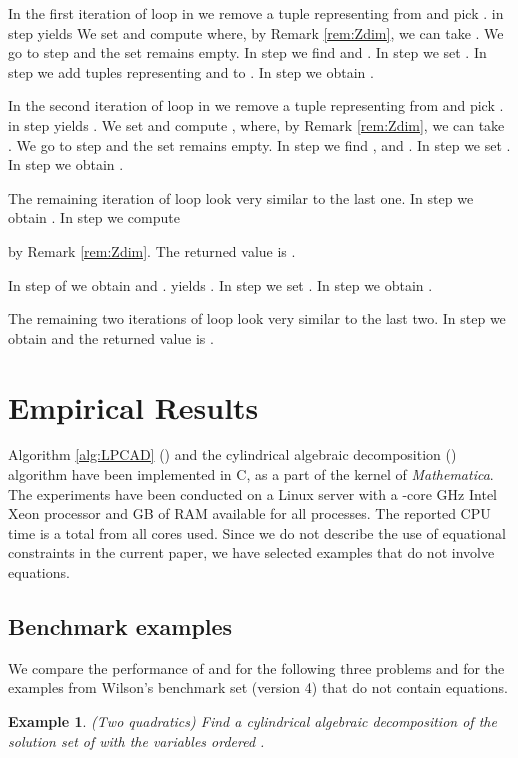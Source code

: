 \documentclass[english]{amsart}
\numberwithin{equation}{section}
\numberwithin{figure}{section}
\newtheorem{example}[thm]{Example}
\begin{document}
In the first iteration of loop  in  we remove
a tuple representing  from  and pick .
 in step  yields 
We set  and compute 
where, by Remark \ref{rem:Zdim}, we can take .
We go to step  and the set  remains empty. In step
 we find  and .
In step  we set . In step 
we add tuples representing  and  to .
In step  we obtain . 

In the second iteration of loop  in  we remove
a tuple representing  from  and pick .
 in step  yields .
We set  and compute ,
where, by Remark \ref{rem:Zdim}, we can take .
We go to step  and the set  remains empty. In step
 we find ,  and
. In step  we set .
In step  we obtain . 

The remaining iteration of loop  look very similar to the last
one. In step  we obtain . In step  we compute

by Remark \ref{rem:Zdim}. The returned value is .

In step  of  we obtain  and .
 yields . In step 
we set . In step  we obtain .

The remaining two iterations of loop  look very similar to the
last two. In step  we obtain 
and the returned value is .


\section{Empirical Results}

Algorithm \ref{alg:LPCAD} () and the cylindrical algebraic
decomposition () algorithm have been implemented in C, as a
part of the kernel of \emph{Mathematica}. The experiments have been
conducted on a Linux server with a -core  GHz Intel Xeon
processor and  GB of RAM available for all processes. The reported
CPU time is a total from all cores used. Since we do not describe
the use of equational constraints in the current paper, we have selected
examples that do not involve equations.


\subsection{Benchmark examples}

We compare the performance of  and  for the following
three problems and for the  examples from Wilson's benchmark set
\cite{W2} (version 4) that do not contain equations. 
\begin{example}
\label{exa:Two-quadratics}(Two quadratics) Find a cylindrical algebraic
decomposition of the solution set of 
with the variables ordered .
\end{example}
\end{document}
